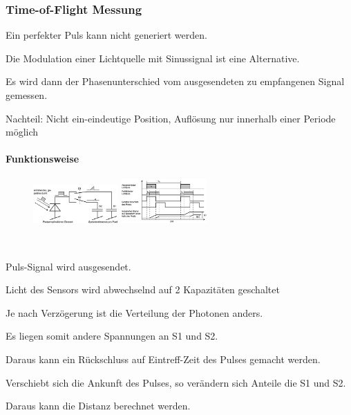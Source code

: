 \subsubsection{Time-of-Flight Messung}
\begin{compactitem}
    \item Ein perfekter Puls kann nicht generiert werden.
    \item Die Modulation einer Lichtquelle mit Sinussignal ist eine Alternative. 
    \item Es wird dann der Phasenunterschied vom ausgesendeten zu empfangenen Signal gemessen.
    \item Nachteil: Nicht ein-eindeutige Position, Auflösung nur innerhalb einer Periode möglich
\end{compactitem}

\paragraph{Funktionsweise}
\begin{figure}
    \vspace{-12pt}
    \centering
    \includegraphics[width=0.29\textwidth]{images/tof_fkt_01}
    \includegraphics[width=0.29\textwidth]{images/tof_fkt_02}
\end{figure}
\ 
\vspace{-5pt}
\begin{compactenum}
    \item Puls-Signal wird ausgesendet.
    \item Licht des Sensors wird abwechselnd auf 2 Kapazitäten geschaltet
    \item Je nach Verzögerung ist die Verteilung der Photonen anders.
    \item Es liegen somit andere Spannungen an S1 und S2.
    \item Daraus kann ein Rückschluss auf Eintreff-Zeit des Pulses gemacht werden.
    \item Verschiebt sich die Ankunft des Pulses, so verändern sich Anteile die S1 und S2.
    \item Daraus kann die Distanz berechnet werden. \\
\end{compactenum}

